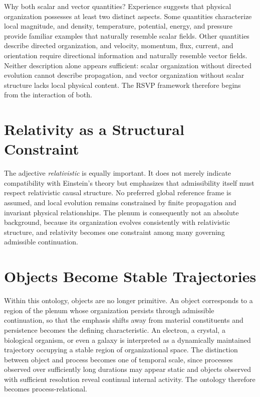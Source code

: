 \documentclass[11pt,oneside]{book}
\numberwithin{equation}{chapter}
\theoremstyle{definition}
\theoremstyle{plain}
\begin{document}
Why both scalar and vector quantities? Experience suggests that physical organization possesses at least two distinct aspects. Some quantities characterize local magnitude, and density, temperature, potential, energy, and pressure provide familiar examples that naturally resemble scalar fields. Other quantities describe directed organization, and velocity, momentum, flux, current, and orientation require directional information and naturally resemble vector fields. Neither description alone appears sufficient: scalar organization without directed evolution cannot describe propagation, and vector organization without scalar structure lacks local physical content. The RSVP framework therefore begins from the interaction of both.

\section{Relativity as a Structural Constraint}

The adjective \emph{relativistic} is equally important. It does not merely indicate compatibility with Einstein's theory but emphasizes that admissibility itself must respect relativistic causal structure. No preferred global reference frame is assumed, and local evolution remains constrained by finite propagation and invariant physical relationships. The plenum is consequently not an absolute background, because its organization evolves consistently with relativistic structure, and relativity becomes one constraint among many governing admissible continuation.

\section{Objects Become Stable Trajectories}

Within this ontology, objects are no longer primitive. An object corresponds to a region of the plenum whose organization persists through admissible continuation, so that the emphasis shifts away from material constituents and persistence becomes the defining characteristic. An electron, a crystal, a biological organism, or even a galaxy is interpreted as a dynamically maintained trajectory occupying a stable region of organizational space. The distinction between object and process becomes one of temporal scale, since processes observed over sufficiently long durations may appear static and objects observed with sufficient resolution reveal continual internal activity. The ontology therefore becomes process-relational.
\end{document}
